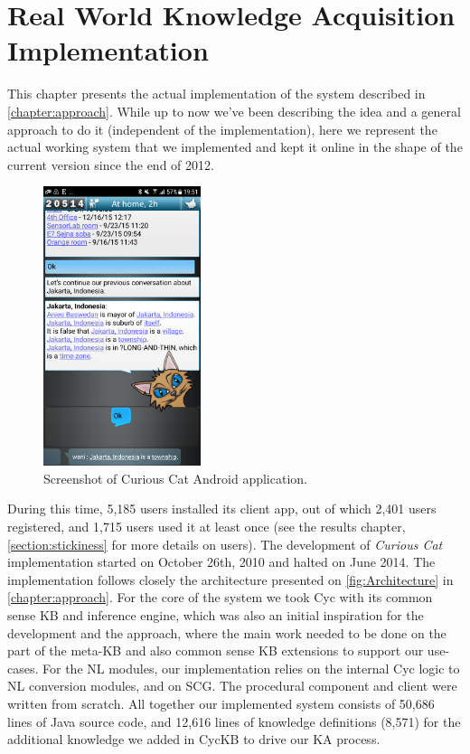 % 
\chapter{Real World Knowledge Acquisition Implementation}
\label{chapter:implementation}
This chapter presents the actual implementation of the system described
in \autoref{chapter:approach}. While up 
to now we've been describing the idea and a general approach to do it 
(independent of the implementation), here we represent the actual working
system that we implemented and kept it online in the shape of the current 
version since the end of 2012. 

\begin{figure}[H]
	\centering
		\includegraphics[width=0.41\textwidth]{figures/androidExample1.png}
	\caption{Screenshot of Curious Cat Android application.}
	\label{fig:androidExample}
\end{figure}

During this time, 5,185 users installed its
client app, out of which 2,401 users registered, and 1,715 users used it at 
least once (see the results chapter, \autoref{section:stickiness} for more 
details on users).
The development  of \emph{Curious Cat} implementation started on October 
26th, 2010 and halted on June 2014. The
implementation follows closely the architecture presented on 
\autoref{fig:Architecture} in \autoref{chapter:approach}. For the core
of the system we took Cyc with its common sense KB and inference engine, which 
was also an initial inspiration for the development and the approach, where
the main work needed to be done on the part of the meta-KB and also common
sense KB extensions to support our use-cases. For the NL modules, our 
implementation relies on the internal Cyc logic to NL conversion modules, and
on SCG\parencite{Schneider2015}. The procedural component and client were 
written from scratch. All together our implemented system consists of 50,686
lines of Java source code, and 12,616 lines of knowledge definitions (8,571) for
the additional knowledge we added in CycKB to drive our KA process.

